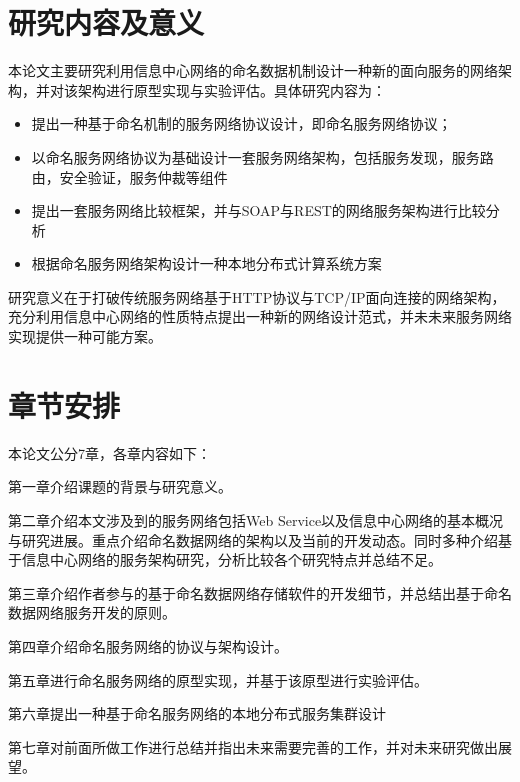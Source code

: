 \section{研究内容及意义}
本论文主要研究利用信息中心网络的命名数据机制设计一种新的面向服务的网络架构，并对该架构进行原型实现与实验评估。具体研究内容为：
\begin{itemize}
\item 提出一种基于命名机制的服务网络协议设计，即命名服务网络协议；
\item 以命名服务网络协议为基础设计一套服务网络架构，包括服务发现，服务路由，安全验证，服务仲裁等组件
\item 提出一套服务网络比较框架，并与SOAP与REST的网络服务架构进行比较分析
\item 根据命名服务网络架构设计一种本地分布式计算系统方案
\end{itemize}
研究意义在于打破传统服务网络基于HTTP协议与TCP/IP面向连接的网络架构，充分利用信息中心网络的性质特点提出一种新的网络设计范式，并未未来服务网络实现提供一种可能方案。
\section{章节安排}
本论文公分7章，各章内容如下：

第一章介绍课题的背景与研究意义。

第二章介绍本文涉及到的服务网络包括Web Service以及信息中心网络的基本概况与研究进展。重点介绍命名数据网络的架构以及当前的开发动态。同时多种介绍基于信息中心网络的服务架构研究，分析比较各个研究特点并总结不足。

第三章介绍作者参与的基于命名数据网络存储软件的开发细节，并总结出基于命名数据网络服务开发的原则。

第四章介绍命名服务网络的协议与架构设计。

第五章进行命名服务网络的原型实现，并基于该原型进行实验评估。

第六章提出一种基于命名服务网络的本地分布式服务集群设计

第七章对前面所做工作进行总结并指出未来需要完善的工作，并对未来研究做出展望。

